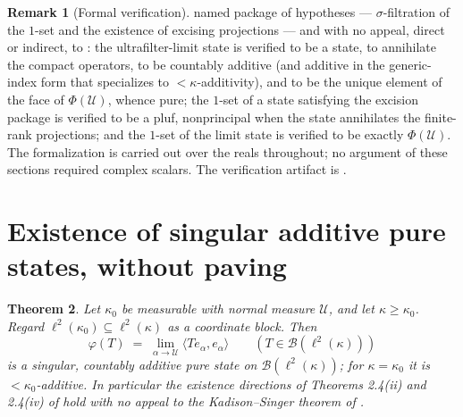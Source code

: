 \documentclass[11pt,reqno]{amsart}
\newtheorem{theorem}{Theorem}[section]
\theoremstyle{definition}
\newtheorem{remark}[theorem]{Remark}
\newcommand{\U}{\mathcal{U}}
\newcommand{\lk}{\ell^2(\kappa)}
\newcommand{\Blk}{\mathcal{B}(\ell^2(\kappa))}
\begin{document}
\begin{remark}[Formal verification]
named package of hypotheses --- $\sigma$-filtration of the $1$-set and the
existence of excising projections --- and with no appeal, direct or indirect,
to \cite{MSS}: the ultrafilter-limit state is verified to be a state, to
annihilate the compact operators, to be countably additive (and additive in
the generic-index form that specializes to $<\kappa$-additivity), and to be
the unique element of the face of $\Phi(\U)$, whence pure; the $1$-set of a
state satisfying the excision package is verified to be a pluf, nonprincipal
when the state annihilates the finite-rank projections; and the $1$-set of
the limit state is verified to be exactly $\Phi(\U)$. The formalization is
carried out over the reals throughout; no argument of these sections required
complex scalars. The verification artifact is \cite{plufLean}.
\end{remark}

\section{Existence of singular additive pure states, without paving}\label{sec:mssfree}

\begin{theorem}\label{thm:mssfree}
Let $\kappa_0$ be measurable with normal measure $\U$, and let $\kappa\ge\kappa_0$.
Regard $\ell^2(\kappa_0)\subseteq\lk$ as a coordinate block. Then
\[
\varphi(T)\;=\;\lim_{\alpha\to\U}\langle Te_\alpha,e_\alpha\rangle
\qquad(T\in\Blk)
\]
is a singular, countably additive pure state on $\Blk$; for $\kappa=\kappa_0$ it is
$<\kappa_0$-additive. In particular the existence directions of Theorems 2.4(ii) and
2.4(iv) of \cite{BlecherWeaver} hold with no appeal to the Kadison--Singer theorem of
\cite{MSS}.
\end{theorem}
\end{document}

